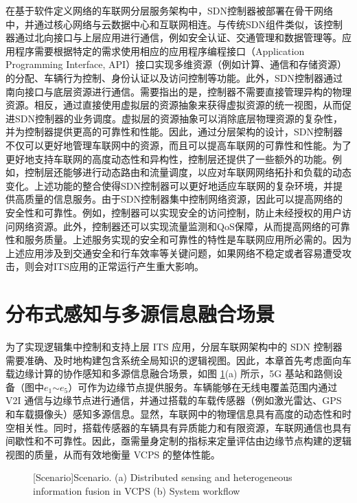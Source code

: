 在基于软件定义网络的车联网分层服务架构中，SDN控制器被部署在骨干网络中，并通过核心网络与云数据中心和互联网相连。与传统SDN组件类似，该控制器通过北向接口与上层应用进行通信，例如安全认证、交通管理和数据管理等。应用程序需要根据特定的需求使用相应的应用程序编程接口（Application Programming Interface, API）接口实现多维资源（例如计算、通信和存储资源）的分配、车辆行为控制、身份认证以及访问控制等功能。此外，SDN控制器通过南向接口与底层资源进行通信。需要指出的是，控制器不需要直接管理异构的物理资源。相反，通过直接使用虚拟层的资源抽象来获得虚拟资源的统一视图，从而促进SDN控制器的业务调度。虚拟层的资源抽象可以消除底层物理资源的复杂性，并为控制器提供更高的可靠性和性能。因此，通过分层架构的设计，SDN控制器不仅可以更好地管理车联网中的资源，而且可以提高车联网的可靠性和性能。为了更好地支持车联网的高度动态性和异构性，控制层还提供了一些额外的功能。例如，控制层还能够进行动态路由和流量调度，以应对车联网网络拓扑和负载的动态变化。上述功能的整合使得SDN控制器可以更好地适应车联网的复杂环境，并提供高质量的信息服务。由于SDN控制器集中控制网络资源，因此可以提高网络的安全性和可靠性。例如，控制器可以实现安全的访问控制，防止未经授权的用户访问网络资源。此外，控制器还可以实现流量监测和QoS保障，从而提高网络的可靠性和服务质量。上述服务实现的安全和可靠性的特性是车联网应用所必需的。因为上述应用涉及到交通安全和行车效率等关键问题，如果网络不稳定或者容易遭受攻击，则会对ITS应用的正常运行产生重大影响。


\section[\hspace{-2pt}分布式感知与多源信息融合场景]{{ \hspace{-8pt}分布式感知与多源信息融合场景}}\label{section 2-3}

为了实现逻辑集中控制和支持上层 ITS 应用，分层车联网架构中的 SDN 控制器需要准确、及时地构建包含系统全局知识的逻辑视图。因此，本章首先考虑面向车载边缘计算的协作感知和多源信息融合场景，如图 \ref{fig 2-2}(a) 所示，5G 基站和路侧设备（图中$e_1$$\sim$$e_5$）可作为边缘节点提供服务。车辆能够在无线电覆盖范围内通过 V2I 通信与边缘节点进行通信，并通过搭载的车载传感器（例如激光雷达、GPS 和车载摄像头）感知多源信息。显然，车联网中的物理信息具有高度的动态性和时空相关性。同时，搭载传感器的车辆具有异质能力和有限资源，车联网通信也具有间歇性和不可靠性。因此，亟需量身定制的指标来定量评估由边缘节点构建的逻辑视图的质量，从而有效地衡量 VCPS 的整体性能。

\begin{figure}[h]
     \centering
     [Scenario]{Scenario. (a) Distributed sensing and heterogeneous information fusion in VCPS (b) System workflow}
     \label{fig 2-2}
\end{figure}

